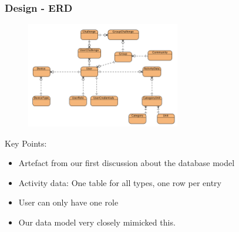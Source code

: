 \documentclass[10pt, compress]{beamer}
\begin{document}
\begin{frame}[fragile]
  \frametitle{Design - ERD}
  
  
    	   \begin{figure}
  \begin{center}
    \includegraphics[width=0.6\textwidth]{../design/database/GoAber-ERD.png}
  \end{center}
  \end{figure}
  
  	Key Points:
  
  	\begin{itemize}
		\item Artefact from our first discussion about the database model
	   	\item Activity data: One table for all types, one row per entry
	   	\item User can only have one role
	   	\item Our data model very closely mimicked this.
	\end{itemize}
     

\end{frame}

\end{document}
